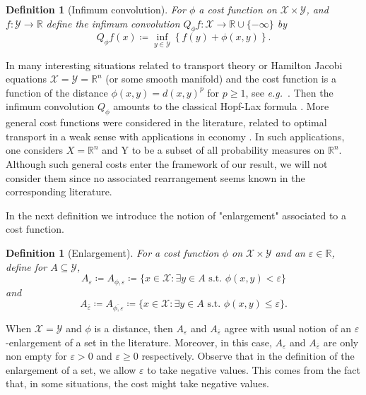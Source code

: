 \documentclass[11pt]{article}
\newtheorem{definition}[conjecture]{Definition}
\newcommand{\1}{[1]}
\begin{document}
\begin{definition}[Infimum convolution] \label{def:inf-convolution}
    For $\phi$ a cost function on $\mathcal{X} \times \mathcal{Y}$, and $f: \mathcal{Y} \to \mathbb{R}$ define the \emph{infimum convolution} $Q_\phi f: \mathcal{X} \to \mathbb{R} \cup \{-\infty\}$ by
    \[
        Q_\phi f (x) \coloneqq \inf_{y \in \mathcal{Y}} \left\{ f(y) + \phi(x,y) \right\}.
    \]
\end{definition}

In many interesting situations related to transport theory or Hamilton Jacobi equations $\mathcal{X}=\mathcal{Y}=\mathbb{R}^n$ (or some smooth manifold) and the cost function is a function of the distance $\phi(x,y)=d(x,y)^p$ for $p \geq 1$, see \textit{e.g.}\ \cite{villani}. Then the infimum convolution $Q_\phi$ amounts to the classical Hopf-Lax formula \cite{evans}.
More general cost functions were considered in the literature, related to optimal transport in a weak sense \cite{GRST} with applications in economy \cite{Backhoff-Veraguas-Pammer}. In such applications, one considers $X=\mathbb{R}^n$ and Y to be a subset of all probability measures on $\mathbb{R}^n$.
Although such general costs enter the framework of our result, we will not consider them since no associated rearrangement seems known in the corresponding literature. %


In the next definition we introduce the notion of "enlargement" associated to a cost function.


\begin{definition}[Enlargement]
    For a cost function $\phi$ on $\mathcal{X} \times \mathcal{Y}$ and an $\varepsilon \in \mathbb{R}$, define for $A \subseteq \mathcal{Y}$,
    \[
        A_\varepsilon \coloneqq A_{\phi,\varepsilon} \coloneqq \{x \in \mathcal{X} : \exists y \in A \text{ s.t. }  \phi(x,y) < \varepsilon \} 
    \]
    and 
     \[
        A_{\overline{{\varepsilon}}} \coloneqq  A_{\overline{\phi,\varepsilon}} \coloneqq \{x \in \mathcal{X} : \exists y \in A \text{ s.t. }  \phi(x,y) \leq \varepsilon \}.
    \]
\end{definition}


When $\mathcal{X} = \mathcal{Y}$ and $\phi$ is a distance, then $A_\varepsilon$ and $A_{\overline{\varepsilon}}$ agree with usual notion of an $\varepsilon$-enlargement of a set in the literature. Moreover, in this case, $A_\varepsilon$ and $A_{\overline{\varepsilon}}$ are only non empty for $\varepsilon > 0$ and $\varepsilon \geq 0$ respectively.
Observe that in the definition of the enlargement of a set, we allow $\varepsilon$ to take negative values. This comes from the fact that, in some situations, the cost might take negative values.
\end{document}
